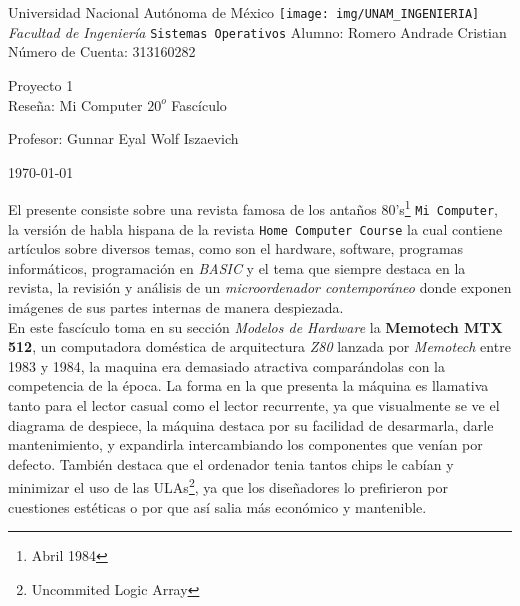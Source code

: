 \documentclass[12pt]{article}
\begin{document}
\begin{titlepage}
  \begin{center}
    \Huge{Universidad Nacional Autónoma de México}
    \vfill
    \texttt{[image: img/UNAM\_INGENIERIA]}
    \vfill
    \LARGE{\emph{Facultad de Ingeniería}}
    \vfill
    \LARGE{\texttt{Sistemas Operativos}}
    \vfill
    \Large{Alumno: Romero Andrade Cristian\\Número de Cuenta: 313160282} 
    
    \vfill
    
    \huge{Proyecto 1\\Reseña: Mi Computer $20^o$ Fascículo}
    \vfill
    
    
    \large{Profesor: Gunnar Eyal Wolf Iszaevich}

    \vfill

    {\large \today\par}
    \newpage
  \end{center}
\end{titlepage}




El presente consiste sobre una revista famosa de los antaños 80's\footnote{Abril 1984} \texttt{Mi Computer},
la versión de habla hispana de la revista \texttt{Home Computer Course} la cual contiene artículos sobre
diversos temas, como son el hardware, software, programas informáticos, programación en \textit{BASIC} y el
tema que siempre destaca en la revista, la revisión y análisis de un \textit{microordenador contemporáneo} donde
exponen imágenes de sus partes internas de manera despiezada.\\

En este fascículo toma en su sección \textit{Modelos de Hardware} la \textbf{Memotech MTX 512}, un computadora
doméstica de arquitectura \textit{Z80} lanzada por \textit{Memotech} entre 1983 y 1984, la maquina era
demasiado atractiva comparándolas con la competencia de la época. La forma en la que presenta la máquina es
llamativa tanto para el lector casual como el lector recurrente, ya que visualmente se ve el diagrama de
despiece, la máquina destaca por su facilidad de desarmarla, darle mantenimiento, y
expandirla intercambiando los componentes
que venían por defecto. También destaca que el ordenador tenia tantos chips le cabían y minimizar el uso de las
ULAs\footnote{Uncommited Logic Array}, ya que los diseñadores lo prefirieron por cuestiones estéticas
o por que así salia más económico y mantenible.
\end{document}
